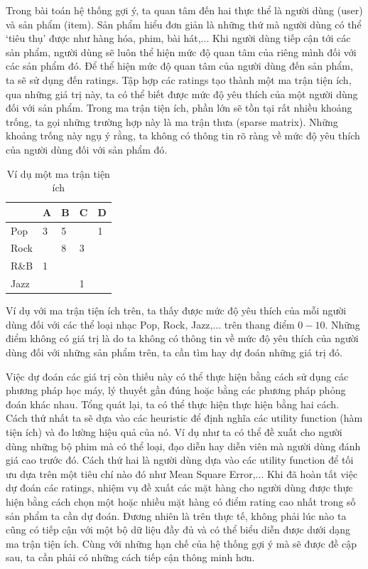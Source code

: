 Trong bài toán hệ thống gợi ý, ta quan tâm đến hai thực thể là người dùng (user) và sản phẩm (item). Sản phẩm hiểu đơn giản là những thứ mà người dùng có thể `tiêu thụ' được như hàng hóa, phim, bài hát,... Khi người dùng tiếp cận tới các sản phẩm, người dùng sẽ luôn thể hiện mức độ quan tâm của riêng mình đối với các sản phẩm đó. Để thể hiện mức độ quan tâm của người dùng đến sản phẩm, ta sẽ sử dụng đến ratings. Tập hợp các ratings tạo thành một ma trận tiện ích, qua những giá trị này, ta có thể biết được mức độ yêu thích của một người dùng đối với sản phẩm. Trong ma trận tiện ích, phần lớn sẽ tồn tại rất nhiều khoảng trống, ta gọi những trường hợp này là ma trận thưa (sparse matrix). Những khoảng trống này ngụ ý rằng, ta không có thông tin rõ ràng về mức độ yêu thích của người dùng đối với sản phẩm đó.

\begin{table}[H]
    \centering
    \begin{tabular}{|l|l|l|l|l|}
        \hline
             & A & B & C & D \\ \hline
        Pop  & 3 & 5 &   & 1 \\ \hline
        Rock &   & 8 & 3 &   \\ \hline
        R\&B & 1 &   &   &   \\ \hline
        Jazz &   &   & 1 &   \\ \hline
    \end{tabular}
    \caption{Ví dụ một ma trận tiện ích}
    \label{table:utility-matrix}
\end{table}

Ví dụ với ma trận tiện ích trên, ta thấy được mức độ yêu thích của mỗi người dùng đối với các thể loại nhạc Pop, Rock, Jazz,... trên thang điểm $0-10$. Những điểm không có giá trị là do ta không có thông tin về mức độ yêu thích của người dùng đối với những sản phẩm trên, ta cần tìm hay dự đoán những giá trị đó.

Việc dự đoán các giá trị còn thiếu này có thể thực hiện bằng cách sử dụng các phương pháp học máy, lý thuyết gần đúng hoặc bằng các phương pháp phỏng đoán khác nhau. Tổng quát lại, ta có thể thực hiện thực hiện bằng hai cách. Cách thứ nhất ta sẽ dựa vào các heuristic để định nghĩa các utility function (hàm tiện ích) và đo lường hiệu quả của nó. Ví dụ như ta có thể đề xuất cho người dùng những bộ phim mà có thể loại, đạo diễn hay diễn viên mà người dùng đánh giá cao trước đó. Cách thứ hai là người dùng dựa vào các utility function để tối ưu dựa trên một tiêu chí nào đó như Mean Square Error,... Khi đã hoàn tất việc dự đoán các ratings, nhiệm vụ đề xuất các mặt hàng cho người dùng được thực hiện bằng cách chọn một hoặc nhiều mặt hàng có điểm rating cao nhất trong số sản phẩm ta cần dự đoán. Đương nhiên là trên thực tế, không phải lúc nào ta cũng có tiếp cận với một bộ dữ liệu đầy đủ và có thể biểu diễn được dưới dạng ma trận tiện ích. Cùng với những hạn chế của hệ thống gợi ý mà sẽ được đề cập sau, ta cần phải có những cách tiếp cận thông minh hơn.

